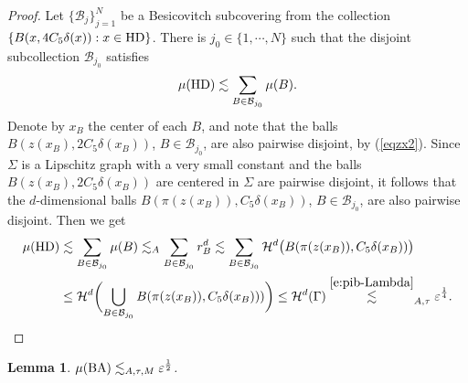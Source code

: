 \documentclass[11pt]{amsart}
\newcommand{\HH}{{\mathcal H}}
\newcommand{\rf}[1]{{(\ref{#1})}}
\newcommand{\ve}{{\varepsilon}}
\newcommand{\HD}{{\mathsf{HD}}}
\newtheorem{lemma}[theorem]{Lemma}
\theoremstyle{definition}
\theoremstyle{remark}
\def\HD{{\rm HD}}
\def\BA{{\rm BA}}
\numberwithin{equation}{section}
\def\cH{{\mathcal{H}}}
\def\lec{\lesssim}
\def\lec{\lesssim}
\begin{document}
\begin{proof}
Let $\{\mathcal{B}_j\}_{j=1}^{N}$ be a Besicovitch subcovering from the collection $\{B(x,4C_5\delta(x)):x\in \HD\}$. 
There is $j_0\in\{1,\cdots,N\}$ such that the disjoint subcollection $\mathcal{B}_{j_0}$ satisfies
$$\mu(\HD)\lesssim \sum_{B\in\mathcal{B}_{j_0}}\mu(B).$$
Denote by $x_B$ the center of each $B$, and note that the balls $B(z(x_B),2C_5\delta(x_B))$, $B\in\mathcal{B}_{j_0}$, are also pairwise disjoint,
by \rf{eqzx2}.
Since $\Sigma$ is a Lipschitz graph with a very small constant and the balls $B(z(x_B),2C_5\delta(x_B))$ are centered in $\Sigma$ are
pairwise disjoint, it follows that the $d$-dimensional balls $B(\pi(z(x_B)),C_5\delta(x_B))$, $B\in\mathcal{B}_{j_0}$, are also pairwise disjoint.
Then we get
\begin{align*}
\mu(\HD)&
\lesssim \sum_{B\in\mathcal{B}_{j_0}} \mu(B)
  \lesssim_{A} \sum_{B\in\mathcal{B}_{j_0}} r_{B}^{d} 
\lec \sum_{B\in\mathcal{B}_{j_0}} \cH^{d}\bigl(B(\pi(z(x_B)),C_5\delta(x_B))\bigr)\\
&\leq \cH^{d}\biggl( \bigcup_{B\in\mathcal{B}_{j_0}}B(\pi(z(x_B)),C_5\delta(x_B)))\biggr)\leq \HH^d(\Gamma)
\stackrel{\eqref{e:pib-Lambda}}
\lec_{A,\tau}
\ve^{\frac{1}{4}}.
\end{align*}
\end{proof}




\begin{lemma}
	$\mu(\BA)\lec_{A,\tau,M} \ve^{\frac{1}{2}}$.  
\end{lemma}
\end{document}

